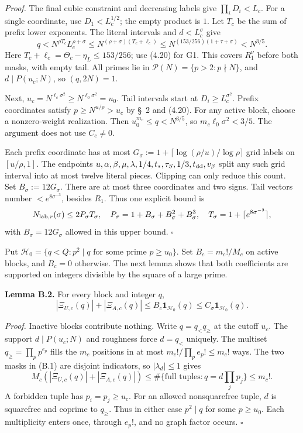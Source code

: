 \emph{Proof.} The final cubic constraint and decreasing labels give $\prod_iD_i<L_c$.
For a single coordinate, use $D_1<L_c^{1/2}$; the empty product is $1$.
Let $T_c$ be the sum of prefix lower exponents.
The literal intervals and $d<L_c^\sigma$ give
\[
 q<N^{\rho T_c}L_c^{\rho+\sigma}
 \le N^{(\rho+\sigma)(T_c+\ell_c)}
 \le N^{(153/256)(1+\tau+\sigma)}<N^{3/5}.
\]
Here $T_c+\ell_c=\Theta_c-\eta_L\le153/256$; use (4.20) for G1.
This covers $R_1^\nu$ before both masks, with empty tail.
All primes lie in $\mathcal P(N)=\{p>2:p\nmid N\}$,
and $d\mid P(u_c;N)$, so $(q,2N)=1$.

Next, $u_c=N^{\ell_c\sigma^2}\ge N^{\ell_0\sigma^2}=u_0$.
Tail intervals start at $D_i\ge L_c^{\sigma^2}$.
Prefix coordinates satisfy $p\ge N^{u/\rho}>u_c$ by \S~2 and (4.20).
For any active block, choose a nonzero-weight realization.
Then $u_0^{m_c}\le q<N^{3/5}$, so $m_c\ell_0\sigma^2<3/5$.
The argument does not use $C_c\ne0$.

Each prefix coordinate has at most
$G_\sigma:=1+\lceil\log(\rho/u)/\log\rho\rceil$ grid labels on $[u/\rho,1]$.
The endpoints
$u,\alpha,\beta,\mu,\lambda,1/4,t_*,\tau_S,1/3,t_{\rm dd},v_\beta$
split any such grid interval into at most twelve literal pieces.
Clipping can only reduce this count. Set $B_\sigma:=12G_\sigma$.
There are at most three coordinates and two signs.
Tail vectors number $<e^{8\sigma^{-3}}$, besides $R_1$.
Thus one explicit bound is
\[
 N_{{\rm lab},r}(\sigma)\le2P_\sigma T_\sigma,\quad
 P_\sigma=1+B_\sigma+B_\sigma^2+B_\sigma^3,\quad
 T_\sigma=1+\lceil e^{8\sigma^{-3}}\rceil,
\]
with $B_\sigma=12G_\sigma$ allowed in this upper bound. $\square$

Put $\mathcal H_0=\{q<Q:p^2\mid q\text{ for some prime }p\ge u_0\}$.
Set $B_c=m_c!/M_c$ on active blocks, and $B_c=0$ otherwise.
The next lemma shows that both coefficients are supported on integers
divisible by the square of a large prime.

\textbf{Lemma B.2.} For every block and integer $q$,
\[
 |\Xi_{U,c}(q)|+|\Xi_{A,c}(q)|
 \le B_c\mathbf1_{\mathcal H_0}(q)
 \le C_\sigma\mathbf1_{\mathcal H_0}(q).
 \tag{B.3}
\]

\emph{Proof.} Inactive blocks contribute nothing. Write $q=q_<q_\ge$ at the cutoff $u_c$.
The support $d\mid P(u_c;N)$ and roughness force $d=q_<$ uniquely.
The multiset $q_\ge=\prod_pp^{e_p}$ fills the $m_c$ positions in at most
$m_c!/\prod_pe_p!\le m_c!$ ways.
The two masks in (B.1) are disjoint indicators,
so $|\lambda_d|\le1$ gives
\[
 M_c(|\Xi_{U,c}(q)|+|\Xi_{A,c}(q)|)
 \le\#\{\text{full tuples}:q=d\textstyle\prod_jp_j\}\le m_c!.
\]
A forbidden tuple has $p_i=p_j\ge u_c$.
For an allowed nonsquarefree tuple, $d$ is squarefree and coprime to $q_\ge$.
Thus in either case $p^2\mid q$ for some $p\ge u_0$.
Each multiplicity enters once, through $e_p!$, and no graph factor occurs. $\square$

